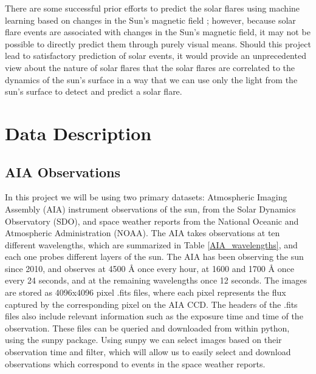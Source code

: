 \documentclass[12pt, letterpaper]{article}
\begin{document}
There are some successful prior efforts to predict the solar flares using machine learning based on changes in the Sun’s magnetic field \cite{Raboonik2016}; however, because solar flare events are associated with changes in the Sun’s magnetic field, it may not be possible to directly predict them through purely visual means. Should this project lead to satisfactory prediction of solar events, it would provide an unprecedented view about the nature of solar flares that the solar flares are correlated to the dynamics of the sun's surface in a way that we can use only the light from the sun's surface to detect and predict a solar flare.


\section*{Data Description}

\subsection*{AIA Observations}

In this project we will be using two primary datasets: Atmospheric Imaging Assembly (AIA) instrument observations of the sun, from the Solar Dynamics Observatory (SDO), and space weather reports from the National Oceanic and Atmospheric Administration (NOAA).
The AIA takes observations at ten different wavelengths, which are summarized in Table \ref{AIA_wavelengths}, and each one probes different layers of the sun. The AIA has been observing the sun since 2010, and observes at 4500 Å once every hour, at 1600 and 1700 Å once every 24 seconds, and at the remaining wavelengths once 12 seconds. The images are stored as 4096x4096 pixel .fits files, where each pixel represents the flux captured by the corresponding pixel on the AIA CCD. The headers of the .fits files also include relevant information such as the exposure time and time of the observation. These files can be queried and downloaded from within python, using the sunpy package. Using sunpy we can select images based on their observation time and filter, which will allow us to easily select and download observations which correspond to events in the space weather reports. 
\end{document}

